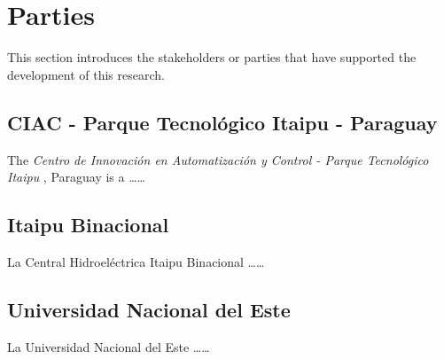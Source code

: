 \section{Parties}

This section introduces the stakeholders or parties 
that have supported the development of this research.



	\subsection{CIAC - Parque Tecnol\'ogico Itaipu - Paraguay}
	The
	\emph{
			Centro de Innovaci\'on en Automatizaci\'on y Control -  
	 		Parque Tecnol\'ogico Itaipu
	 }, 
	 Paraguay is a \ldots\ldots 

	\subsection{Itaipu Binacional}
	La Central Hidroel\'ectrica Itaipu Binacional \ldots\ldots
	
	\subsection{Universidad Nacional del Este}
	La Universidad Nacional del Este \ldots\ldots
	
	